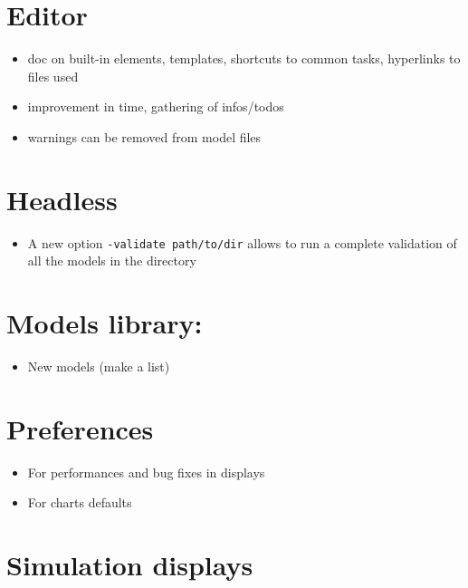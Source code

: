 \documentclass[]{book}
\providecommand{\tightlist}{%
  \setlength{\itemsep}{0pt}\setlength{\parskip}{0pt}}
\theoremstyle{definition}
\theoremstyle{definition}
\theoremstyle{definition}
\theoremstyle{remark}
\begin{document}
\section{Editor}\label{editor}

\begin{itemize}
\tightlist
\item
  doc on built-in elements, templates, shortcuts to common tasks,
  hyperlinks to files used
\item
  improvement in time, gathering of infos/todos
\item
  warnings can be removed from model files
\end{itemize}

\section{Headless}\label{headless}

\begin{itemize}
\tightlist
\item
  A new option \texttt{-validate\ path/to/dir} allows to run a complete
  validation of all the models in the directory
\end{itemize}

\section{Models library:}\label{models-library}

\begin{itemize}
\tightlist
\item
  New models (make a list)
\end{itemize}

\section{Preferences}\label{preferences}

\begin{itemize}
\tightlist
\item
  For performances and bug fixes in displays
\item
  For charts defaults
\end{itemize}

\section{Simulation displays}\label{simulation-displays}
\end{document}
